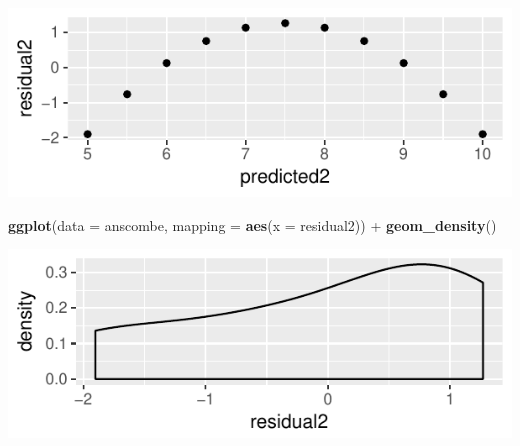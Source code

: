 \documentclass[]{article}
\newenvironment{Shaded}{\begin{snugshade}}{\end{snugshade}}
\newcommand{\KeywordTok}[1]{\textcolor[rgb]{0.13,0.29,0.53}{\textbf{{#1}}}}
\newcommand{\DataTypeTok}[1]{\textcolor[rgb]{0.13,0.29,0.53}{{#1}}}
\newcommand{\StringTok}[1]{\textcolor[rgb]{0.31,0.60,0.02}{{#1}}}
\newcommand{\NormalTok}[1]{{#1}}
\begin{document}
\begin{Shaded}
\end{Shaded}

\includegraphics{20180417_anscombe_residuals_files/figure-latex/unnamed-chunk-7-1.pdf}

\begin{Shaded}
\begin{Highlighting}[]
\KeywordTok{ggplot}\NormalTok{(}\DataTypeTok{data =} \NormalTok{anscombe, }\DataTypeTok{mapping =} \KeywordTok{aes}\NormalTok{(}\DataTypeTok{x =} \NormalTok{residual2)) +}
\StringTok{  }\KeywordTok{geom_density}\NormalTok{()}
\end{Highlighting}
\end{Shaded}

\includegraphics{20180417_anscombe_residuals_files/figure-latex/unnamed-chunk-8-1.pdf}
\end{document}
